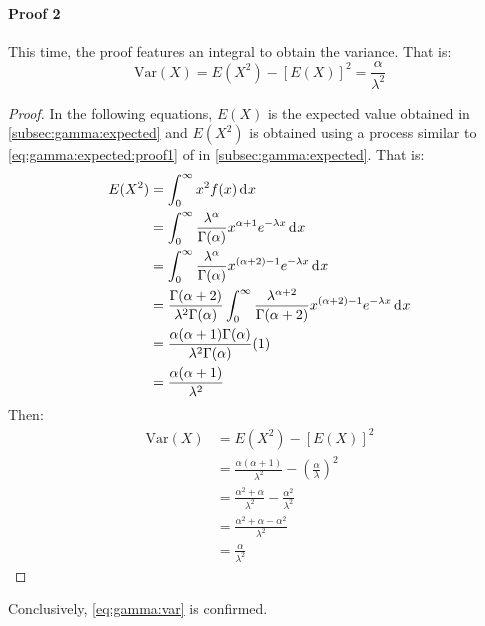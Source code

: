 \documentclass[12pt]{article}
\begin{document}
\paragraph{Proof 2}
This time, the proof features an integral to obtain the variance. That is:
\begin{equation}\label{eq:gamma:var:proof2}
	\text{Var}(X) = E(X^2)-[E(X)]^2 = \frac{\alpha}{\lambda^2}
\end{equation}
\begin{proof}
	In the following equations, $E(X)$ is the expected value obtained in \autoref{subsec:gamma:expected} and $E(X^2)$ is
	obtained using a process similar to \autoref{eq:gamma:expected:proof1} of  in
	\autoref{subsec:gamma:expected}. That is:
	\begin{equation}
		\begin{split}
			E(X^2)	&=	\int^\infty_0 x^2f(x)\mathop{}\!\mathrm{d^{}}x\\
					&=	\int^\infty_0 \frac{\lambda^\alpha}{\Gamma(\alpha)}x^{\alpha+1} e^{-\lambda x}\mathop{}\!\mathrm{d^{}}x\\
					&=	\int^\infty_0 \frac{\lambda^\alpha}{\Gamma(\alpha)}x^{(\alpha+2)-1} e^{-\lambda x}\mathop{}\!\mathrm{d^{}}x\\
					&=	\frac{\Gamma(\alpha+2)}{\lambda^2\Gamma(\alpha)} \int^\infty_0 \frac{\lambda^{\alpha+2}}{\Gamma(\alpha+2)}x^{(\alpha+2)-1} e^{-\lambda x}\mathop{}\!\mathrm{d^{}}x\\
					&=	\frac{\alpha(\alpha+1)\Gamma(\alpha)}{\lambda^2\Gamma(\alpha)}(1)\\
					&=	\frac{\alpha(\alpha+1)}{\lambda^2}
		\end{split}
	\end{equation}
	Then:
	\begin{equation}
		\begin{split}
			\text{Var}(X)	&=	E(X^2)-[E(X)]^2\\
							&=	\frac{\alpha(\alpha+1)}{\lambda^2} - \left(\frac{\alpha}{\lambda}\right)^2\\
							&=	\frac{\alpha^2+\alpha}{\lambda^2} - \frac{\alpha^2}{\lambda^2}\\
							&=	\frac{\alpha^2 + \alpha -\alpha^2}{\lambda^2}\\
							&=	\frac{\alpha}{\lambda^2}
		\end{split}
	\end{equation}
\end{proof}
Conclusively, \autoref{eq:gamma:var} is confirmed.

\end{document}
